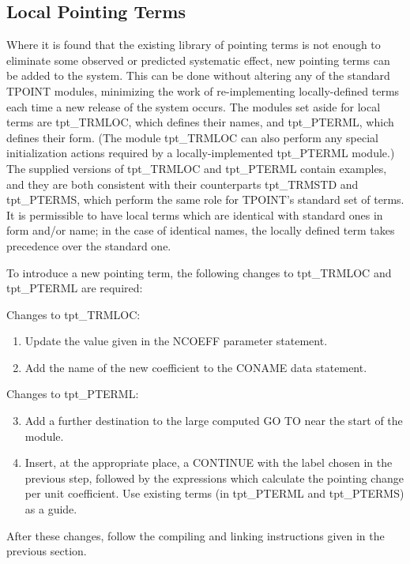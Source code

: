 \subsection{Local Pointing Terms}
Where it is found that the existing library of pointing terms is
not enough to eliminate some observed or predicted systematic
effect, new pointing terms can be added to the system.  This
can be done without altering any of the standard TPOINT modules,
minimizing the work of re-implementing locally-defined terms each
time a new release of the system occurs.  The modules set aside
for local terms are tpt\_TRMLOC, which defines their names, and tpt\_PTERML,
which defines their form.  (The module tpt\_TRMLOC
can also perform any special
initialization actions required by a locally-implemented tpt\_PTERML module.)
The supplied versions of tpt\_TRMLOC and tpt\_PTERML
contain examples, and they are both consistent with their
counterparts tpt\_TRMSTD and tpt\_PTERMS, which perform the same role for
TPOINT's standard set of terms.  It is permissible to have
local terms which are identical with standard ones in form and/or
name; in the case of identical names, the locally defined term
takes precedence over the standard one.

To introduce a new pointing term, the following changes to tpt\_TRMLOC
and tpt\_PTERML are required:

Changes to tpt\_TRMLOC:
\begin{enumerate}
\item Update the value given in the NCOEFF parameter statement.
\item Add the name of the new coefficient to the CONAME data
      statement.
\end{enumerate}

Changes to tpt\_PTERML:
\begin{enumerate}
\setcounter{enumi}{2}
\item Add a further destination to the large computed GO TO near
      the start of the module.
\item Insert, at the appropriate place, a CONTINUE with the label
      chosen in the previous step, followed by the expressions which
      calculate the pointing change per unit coefficient.  Use
      existing terms (in tpt\_PTERML and tpt\_PTERMS) as a guide.
\end{enumerate}

After these changes, follow the compiling and linking instructions
given in the previous section.


